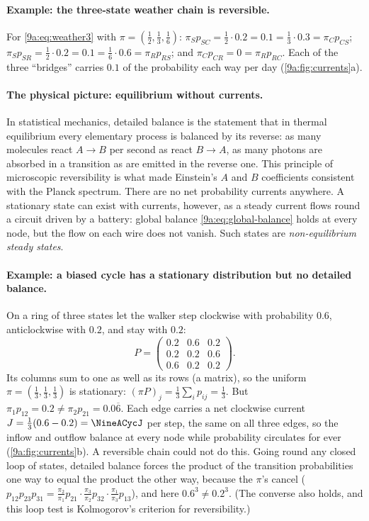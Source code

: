 \paragraph{Example: the three-state weather chain is reversible.}
For \eqref{9a:eq:weather3} with $\pi=(\tfrac12,\tfrac13,\tfrac16)$:
$\pi_Sp_{SC}=\tfrac12\cdot0.2=0.1=\tfrac13\cdot0.3=\pi_Cp_{CS}$;
$\pi_Sp_{SR}=\tfrac12\cdot0.2=0.1=\tfrac16\cdot0.6=\pi_Rp_{RS}$; and
$\pi_Cp_{CR}=0=\pi_Rp_{RC}$. Each of the three ``bridges'' carries $0.1$ of the probability each
way per day (\cref{9a:fig:currents}a).

\paragraph{The physical picture: equilibrium without currents.}
In statistical mechanics, detailed balance is the statement that in thermal equilibrium every
elementary process is balanced by its reverse: as many molecules react $A\to B$ per second as
react $B\to A$, as many photons are absorbed in a transition as are emitted in the reverse one.
This principle of microscopic reversibility is what made Einstein's $A$ and $B$ coefficients
consistent with the Planck spectrum. There are no net probability currents anywhere. A
stationary state can exist with currents, however, as a steady current flows round a circuit
driven by a battery: global balance \eqref{9a:eq:global-balance} holds at every node, but the
flow on each wire does not vanish. Such states are \emph{non-equilibrium steady states}.

\paragraph{Example: a biased cycle has a stationary distribution but no detailed balance.}
On a ring of three states let the walker step clockwise with probability $0.6$, anticlockwise
with $0.2$, and stay with $0.2$:
\begin{equation*}
  P=\begin{pmatrix}0.2&0.6&0.2\\0.2&0.2&0.6\\0.6&0.2&0.2\end{pmatrix}.
\end{equation*}
Its columns sum to one as well as its rows (a  matrix), so the
uniform $\pi=(\tfrac13,\tfrac13,\tfrac13)$ is stationary: $(\pi P)_j=\tfrac13\sum_ip_{ij}=\tfrac13$.
But $\pi_1p_{12}=0.2\ne\pi_2p_{21}=0.0\overline{6}$. Each edge carries a net clockwise current
$J=\tfrac13(0.6-0.2)=\NineACycJ$ per step, the same on all three edges, so the inflow and
outflow balance at every node while probability circulates for ever (\cref{9a:fig:currents}b).
A reversible chain could not do this. Going round any closed loop of states, detailed balance
forces the product of the transition probabilities one way to equal the product the other way,
because the $\pi$'s cancel ($p_{12}p_{23}p_{31}=\frac{\pi_2}{\pi_1}p_{21}\cdot\frac{\pi_3}{\pi_2}p_{32}
\cdot\frac{\pi_1}{\pi_3}p_{13}$), and here $0.6^3\ne0.2^3$. (The converse also holds, and this
loop test is Kolmogorov's criterion for reversibility.)


